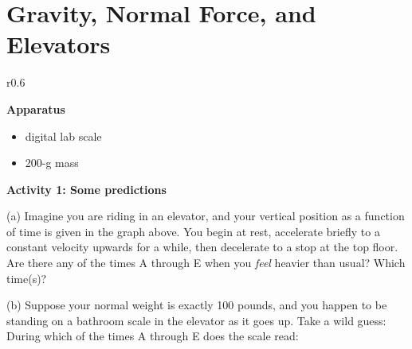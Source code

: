 \section{Gravity, Normal Force, and Elevators}


\makelabheader %

\begin{wrapfigure}[4]{r}{0.6\textwidth}
\end{wrapfigure}

\medskip
\bigskip
\textbf{Apparatus}

\begin{itemize}[nosep]
\item digital lab scale
\item 200-g mass
\end{itemize}

\medskip
\bigskip
\textbf{Activity 1: Some predictions}

(a) Imagine you are riding in an elevator, and your vertical position as a function of time is given in the graph above.  You begin at rest, accelerate briefly to a constant velocity upwards for a while, then decelerate to a stop at the top floor.  Are there any of the times A through E when you \textit{feel} heavier than usual?  Which time(s)?
\answerspace{0.4in}


(b) Suppose your normal weight is exactly 100 pounds, and you happen to be standing on a bathroom scale in the elevator as it goes up.  Take a wild guess: During which of the times A through E does the scale read:

